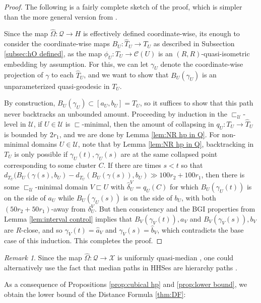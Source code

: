 \documentclass{amsart}
\theoremstyle{definition}
\theoremstyle{remark}
\newtheorem{remark}[theorem]{Remark}
\theoremstyle{definition}
\newcommand{\calC}{\mathcal{C}}
\newcommand{\calQ}{\mathcal{Q}}
\newcommand{\calU}{\mathcal{U}}
\newcommand{\calX}{\mathcal{X}}
\newcommand{\hT}{\widehat{T}}
\newcommand{\ha}{\hat{a}}
\newcommand{\hb}{\hat{b}}
\newcommand{\hd}{\hat{\delta}}
\newcommand{\hO}{\widehat{\Omega}}
\newcommand{\nest}{\sqsubset}
\begin{document}
\begin{proof}
The following is a fairly complete sketch of the proof, which is simpler than the more general version from \cite[Proposition 14.8]{Dur_infcube}.

Since the map $\hO:\calQ \to H$ is effectively defined coordinate-wise, its enough to consider the coordinate-wise maps $B_U:\hT_U \to T_U$ as described in Subsection \ref{subsec:hO defined}, as the map $\phi_U:T_U\to \calC(U)$ is an $(R,R)$-quasi-isometric embedding by assumption.  For this, we can let $\gamma_U$ denote the coordinate-wise projection of $\gamma$ to each $\hT_U$, and we want to show that $B_U(\gamma_U)$ is an unparameterized quasi-geodesic in $T_U$.

By construction, $B_U(\gamma_U) \subset [a_U,b_U] = T_U$, so it suffices to show that this path never backtracks an unbounded amount.  Proceeding by induction in the $\nest_{\calU}$-level in $\calU$, if $U \in \calU$ is $\nest$-minimal, then the amount of collapsing in $q_U:T_U \to \hT_U$ is bounded by $2r_1$, and we are done by Lemma \ref{lem:NR hp in Q}.  For non-minimal domains $U \in \calU$, note that by Lemma \ref{lem:NR hp in Q}, backtracking in $T_U$ is only possible if $\gamma_U(t), \gamma_U(s)$ are at the same collapsed point corresponding to some cluster $C$.  If there are times $s < t$ so that $d_{T_U}(B_U(\gamma(s), b_U) - d_{T_U}(B_U(\gamma(s)),b_U) \gg 100r_2 + 100r_1$, then there is some $\nest_{\calU}$-minimal domain $V \nest U$ with $\hd^V_U = q_U(C)$ for which $B_U(\gamma_U(t))$ is on the side of $a_U$ while $B_U(\gamma_U(s))$ is on the side of $b_U$, with both $(50r_2 + 50r_1)$-away from $\delta^V_U$.  But then consistency and the BGI properties from Lemma \ref{lem:interval control} implies that $B_V(\gamma_V(t)), a_V$ and $B_V(\gamma_V(s)),b_V$ are $R$-close, and so $\gamma_V(t) = \ha_V$ and $\gamma_V(s) = \hb_V$, which contradicts the base case of this induction.  This completes the proof.
\end{proof}

\begin{remark}
     Since the map $\hO: \calQ \to \calX$ is uniformly quasi-median \cite[Section 15]{Dur_infcube}, one could alternatively use the fact that median paths in HHSes are hierarchy paths \cite[Lemma 1.37]{HHS_quasi}.
\end{remark}

As a consequence of Propositions \ref{prop:cubical hp} and \ref{prop:lower bound}, we obtain the lower bound of the Distance Formula \ref{thm:DF}:
\end{document}
